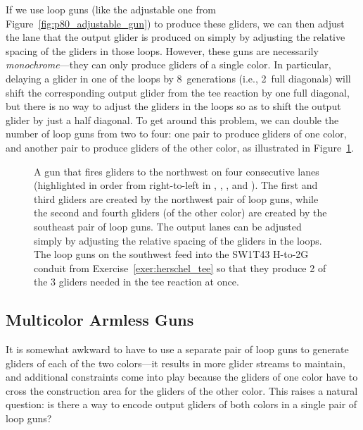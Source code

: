 If we use loop guns (like the adjustable one from Figure~\ref{fig:p80_adjustable_gun}) to produce these gliders, we can then adjust the lane that the output glider is produced on simply by adjusting the relative spacing of the gliders in those loops. However, these guns are necessarily \emph{monochrome}---they can only produce gliders of a single color. In particular, delaying a glider in one of the loops by $8$~generations (i.e., 2~full diagonals) will shift the corresponding output glider from the tee reaction by one full diagonal, but there is no way to adjust the gliders in the loops so as to shift the output glider by just a half diagonal. To get around this problem, we can double the number of loop guns from two to four: one pair to produce gliders of one color, and another pair to produce gliders of the other color, as illustrated in Figure~\ref{fig:armless_4_lane_monochrome_gun}.

\clearpage %

\begin{figure}[!htb]
	\centering
	\caption{A gun that fires gliders to the northwest on four consecutive lanes (highlighted in order from right-to-left in , , , and ). The first and third gliders are created by the northwest pair of loop guns, while the second and fourth gliders (of the other color) are created by the southeast pair of loop guns. The output lanes can be adjusted simply by adjusting the relative spacing of the gliders in the loops. The loop guns on the southwest feed into the SW1T43 H-to-2G conduit from Exercise~\ref{exer:herschel_tee} so that they produce 2 of the 3 gliders needed in the tee reaction at once.}\label{fig:armless_4_lane_monochrome_gun}
\end{figure}


\subsection{Multicolor Armless Guns}\label{sec:multicolor_armless_guns}

It is somewhat awkward to have to use a separate pair of loop guns to generate gliders of each of the two colors---it results in more glider streams to maintain, and additional constraints come into play because the gliders of one color have to cross the construction area for the gliders of the other color. This raises a natural question: is there a way to encode output gliders of both colors in a single pair of loop guns?


